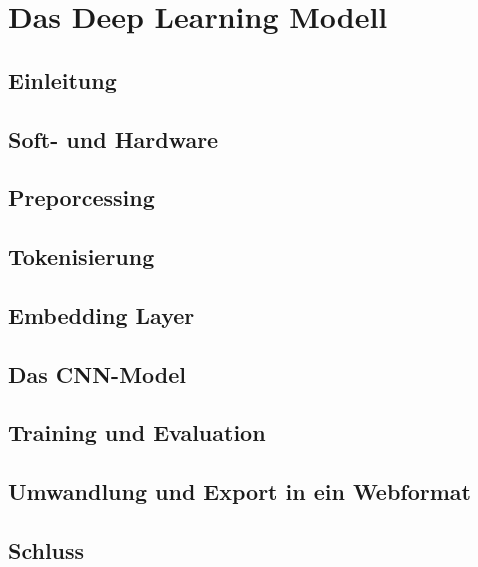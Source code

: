 \section{Das Deep Learning Modell}
\subsection{Einleitung}
\subsection{Soft- und Hardware}
\subsection{Preporcessing}
\subsection{Tokenisierung}
\subsection{Embedding Layer}
\subsection{Das CNN-Model}
\subsection{Training und Evaluation}
\subsection{Umwandlung und Export in ein Webformat}
\subsection{Schluss}
